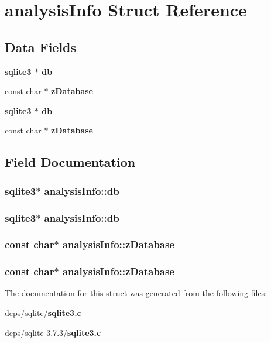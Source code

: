 \section{analysis\-Info Struct Reference}
\label{structanalysisInfo}
\subsection*{Data Fields}
\begin{CompactItemize}
\item 
\bf{sqlite3} $\ast$ \bf{db}
\item 
const char $\ast$ \bf{z\-Database}
\item 
\bf{sqlite3} $\ast$ \bf{db}
\item 
const char $\ast$ \bf{z\-Database}
\end{CompactItemize}


\subsection{Field Documentation}
\subsubsection{\setlength{\rightskip}{0pt plus 5cm}\bf{sqlite3}$\ast$ \bf{analysis\-Info::db}}\label{structanalysisInfo_74eb85137ba86d5c16e067054319f2af}


\subsubsection{\setlength{\rightskip}{0pt plus 5cm}\bf{sqlite3}$\ast$ \bf{analysis\-Info::db}}\label{structanalysisInfo_74eb85137ba86d5c16e067054319f2af}


\subsubsection{\setlength{\rightskip}{0pt plus 5cm}const char$\ast$ \bf{analysis\-Info::z\-Database}}\label{structanalysisInfo_c891a2e66c28d4355bbf0adf78b0078f}


\subsubsection{\setlength{\rightskip}{0pt plus 5cm}const char$\ast$ \bf{analysis\-Info::z\-Database}}\label{structanalysisInfo_c891a2e66c28d4355bbf0adf78b0078f}




The documentation for this struct was generated from the following files:\begin{CompactItemize}
\item 
deps/sqlite/\bf{sqlite3.c}\item 
deps/sqlite-3.7.3/\bf{sqlite3.c}\end{CompactItemize}
